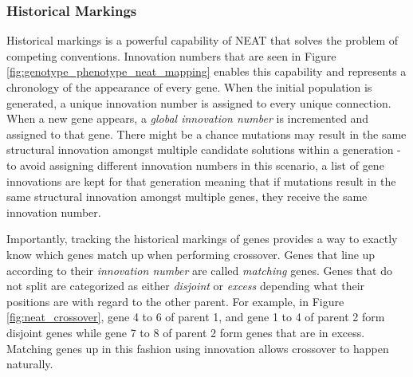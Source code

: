 \subsubsection{Historical Markings}
Historical markings is a powerful capability of NEAT that solves the problem of competing conventions. Innovation numbers that are seen in Figure \ref{fig:genotype_phenotype_neat_mapping} enables this capability and represents a chronology of the appearance of every gene. When the initial population is generated, a unique innovation number is assigned to every unique connection. When a new gene appears, a \textit{global innovation number} is incremented and assigned to that gene. There might be a chance mutations may result in the same structural innovation amongst multiple candidate solutions within a generation - to avoid assigning different innovation numbers in this scenario, a list of gene innovations are kept for that generation meaning that if mutations result in the same structural innovation amongst multiple genes, they receive the same innovation number. \bigskip

\noindent Importantly, tracking the historical markings of genes provides a way to exactly know which genes match up when performing crossover. Genes that line up according to their \textit{innovation number} are called \textit{matching} genes. Genes that do not split are categorized as either \textit{disjoint} or \textit{excess} depending what their positions are with regard to the other parent. For example, in Figure \ref{fig:neat_crossover}, gene 4 to 6 of parent 1, and gene 1 to 4 of parent 2 form disjoint genes while gene 7 to 8 of parent 2 form genes that are in excess. Matching genes up in this fashion using innovation allows crossover to happen naturally.

